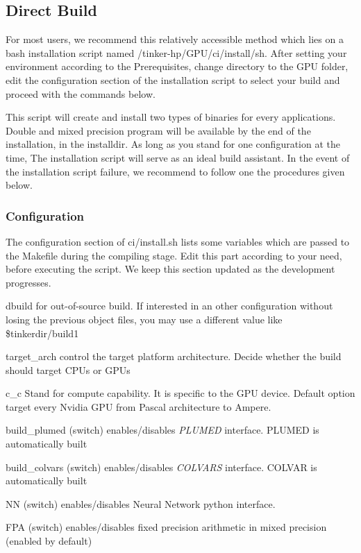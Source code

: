 \subsection*{Direct Build}

For most users, we recommend this relatively accessible method which lies on a bash installation script named {\ttfamily /tinker-\/hp/\-G\-P\-U/ci/install/sh}. After setting your environment according to the Prerequisites, change directory to the G\-P\-U folder, edit the configuration section of the installation script to select your build and proceed with the commands below.




This script will create and install two types of binaries for every applications. Double and mixed precision program will be available by the end of the installation, in the installdir. As long as you stand for one configuration at the time, The installation script will serve as an ideal build assistant. In the event of the installation script failure, we recommend to follow one the procedures given below.

\subsubsection*{Configuration}

The configuration section of {\ttfamily ci/install.\-sh} lists some variables which are passed to the Makefile during the compiling stage. Edit this part according to your need, before executing the script. We keep this section updated as the development progresses.
\begin{DoxyItemize}
\item {\ttfamily dbuild} for out-\/of-\/source build. If interested in an other configuration without losing the previous object files, you may use a different value like {\ttfamily \$tinkerdir/build1}
\item {\ttfamily target\-\_\-arch} control the target platform architecture. Decide whether the build should target C\-P\-Us or G\-P\-Us
\item {\ttfamily c\-\_\-c} Stand for compute capability. It is specific to the G\-P\-U device. Default option target every Nvidia G\-P\-U from Pascal architecture to Ampere.
\item {\ttfamily build\-\_\-plumed} (switch) enables/disables {\itshape P\-L\-U\-M\-E\-D} interface. P\-L\-U\-M\-E\-D is automatically built
\item {\ttfamily build\-\_\-colvars} (switch) enables/disables {\itshape C\-O\-L\-V\-A\-R\-S} interface. C\-O\-L\-V\-A\-R is automatically built
\item {\ttfamily N\-N} (switch) enables/disables Neural Network python interface.
\item {\ttfamily F\-P\-A} (switch) enables/disables fixed precision arithmetic in mixed precision (enabled by default)
\end{DoxyItemize}

